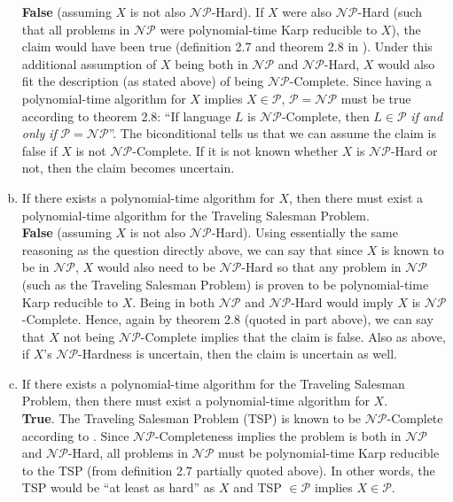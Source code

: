 \documentclass{scrartcl}
\begin{document}
\begin{flushleft}
\begin{enumerate}[(a)]
            \bigskip
            \textbf{False} (assuming $X$ is not also $\mathcal{NP}$-Hard). If $X$ were also
            $\mathcal{NP}$-Hard (such that all problems in $\mathcal{NP}$ were polynomial-time Karp
            reducible to $X$), the claim would have been true (definition 2.7 and theorem 2.8 in
            \cite{modernapp}). Under this additional assumption of $X$ being both in $\mathcal{NP}$
            and $\mathcal{NP}$-Hard, $X$ would also fit the description (as stated above) of being
            $\mathcal{NP}$-Complete. Since having a polynomial-time algorithm for $X$ implies $X \in
            \mathcal{P}$, $\mathcal{P} = \mathcal{NP}$ must be true according to theorem 2.8: ``If
            language $L$ is $\mathcal{NP}$-Complete, then $L \in \mathcal{P}$ \emph{if and only if}
            $\mathcal{P} = \mathcal{NP}$''. The biconditional tells us that we can assume the claim
            is false if $X$ is not $\mathcal{NP}$-Complete. If it is not known whether $X$ is
            $\mathcal{NP}$-Hard or not, then the claim becomes uncertain.
        \item If there exists a polynomial-time algorithm for $X$, then there must exist a
            polynomial-time algorithm for the Traveling Salesman Problem.\\
            \bigskip
            \textbf{False} (assuming $X$ is not also $\mathcal{NP}$-Hard). Using essentially the
            same reasoning as the question directly above, we can say that since $X$ is known to be
            in $\mathcal{NP}$, $X$ would also need to be $\mathcal{NP}$-Hard so that any problem in
            $\mathcal{NP}$ (such as the Traveling Salesman Problem) is proven to be polynomial-time
            Karp reducible to $X$. Being in both $\mathcal{NP}$ and $\mathcal{NP}$-Hard would imply
            $X$ is $\mathcal{NP}$-Complete. Hence, again by theorem 2.8 (quoted in part above), we
            can say that $X$ not being $\mathcal{NP}$-Complete implies that the claim is false. Also
            as above, if $X$'s $\mathcal{NP}$-Hardness is uncertain, then the claim is uncertain as
            well.
        \item If there exists a polynomial-time algorithm for the Traveling Salesman Problem, then
            there must exist a polynomial-time algorithm for $X$.\\
            \bigskip
            \textbf{True}. The Traveling Salesman Problem (TSP) is known to be
            $\mathcal{NP}$-Complete according to \cite{modernapp}. Since $\mathcal{NP}$-Completeness
            implies the problem is both in $\mathcal{NP}$ and $\mathcal{NP}$-Hard, all problems in
            $\mathcal{NP}$ must be polynomial-time Karp reducible to the TSP (from definition 2.7
            partially quoted above). In other words, the TSP would be ``at least as hard'' as $X$
            and TSP $\in \mathcal{P}$ implies $X \in \mathcal{P}$.
    \end{enumerate}

    
    
\end{flushleft}
\end{document}
